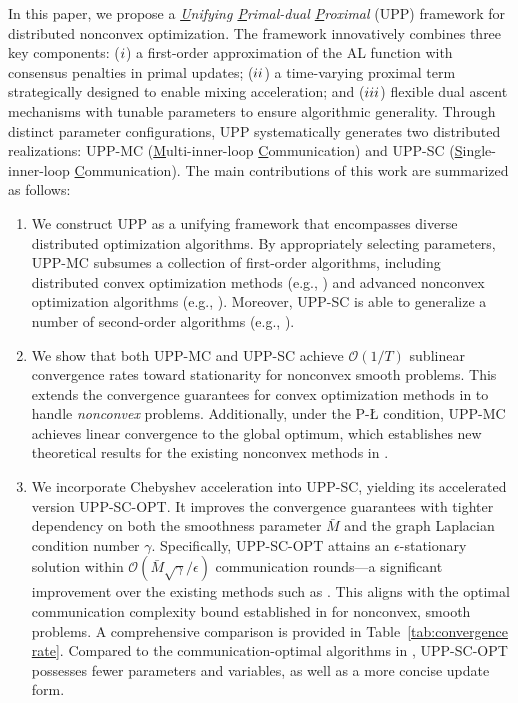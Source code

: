 \documentclass[12pt,draftcls,onecolumn]{IEEEtran}
\begin{document}
In this paper, we propose a \emph{\underline{U}nifying \underline{P}rimal-dual \underline{P}roximal} (UPP) framework for distributed nonconvex optimization. The framework innovatively combines three key components: ($\romannumeral1$) a first-order approximation of the AL function with consensus penalties in primal updates; ($\romannumeral2$) a time-varying proximal term strategically designed to enable mixing acceleration; and ($\romannumeral3$) flexible dual ascent mechanisms with tunable parameters to ensure algorithmic generality. Through distinct parameter configurations, UPP systematically generates two distributed realizations: UPP-MC (\underline{M}ulti-inner-loop \underline{C}ommunication) and UPP-SC (\underline{S}ingle-inner-loop \underline{C}ommunication). The main contributions of this work are summarized as follows:
\begin{enumerate}
    \item[1)] We construct UPP as a unifying framework that encompasses diverse distributed optimization algorithms. By appropriately selecting parameters, UPP-MC subsumes a collection of first-order algorithms, including distributed convex optimization methods (e.g., \cite{shi_extra_2015,AugDGM2015,nedic_achieving_2017,xu_bregman_2018}) and advanced nonconvex optimization algorithms (e.g., \cite{yi2022sublinear,yi2021linear,alghunaim_unified_2022,hong_prox-pda_2017,sun2018distributed}). Moreover, UPP-SC is able to generalize a number of second-order algorithms (e.g., \cite{mokhtari_dqm_2016,wu_second-order_2021}).
    \item[2)] We show that both UPP-MC and UPP-SC achieve $\mathcal{O}(1/T)$ sublinear convergence rates toward stationarity for nonconvex smooth problems. This extends the convergence guarantees for convex optimization methods in \cite{shi_extra_2015,AugDGM2015,xu_bregman_2018,mokhtari_dqm_2016,wu_second-order_2021} to handle \textit{nonconvex} problems. Additionally, under the P-{\L} condition, UPP-MC achieves linear convergence to the global optimum, which establishes new theoretical results for the existing nonconvex methods in \cite{alghunaim_unified_2022,hong_prox-pda_2017,sun2018distributed}.
    \item[3)] We incorporate Chebyshev acceleration into UPP-SC, yielding its accelerated version UPP-SC-OPT. It improves the convergence guarantees with tighter dependency on both the smoothness parameter $\bar{M}$ and the graph Laplacian condition number $\gamma$. Specifically, UPP-SC-OPT attains an $\epsilon$-stationary solution within $\mathcal{O}(\bar{M}\sqrt{\gamma}/\epsilon)$ communication rounds—a significant improvement over the existing methods such as \cite{yi2022sublinear, yi2021linear,alghunaim_unified_2022,hong_prox-pda_2017}. This aligns with the optimal communication complexity bound established in \cite{sun_distributed_2019, mancino2023decentralized} for nonconvex, smooth problems. A comprehensive comparison is provided in Table~\ref{tab:convergence rate}. Compared to the communication-optimal algorithms in \cite{sun_distributed_2019, mancino2023decentralized}, UPP-SC-OPT possesses fewer parameters and variables, as well as a more concise update form.

\end{enumerate}
\end{document}

